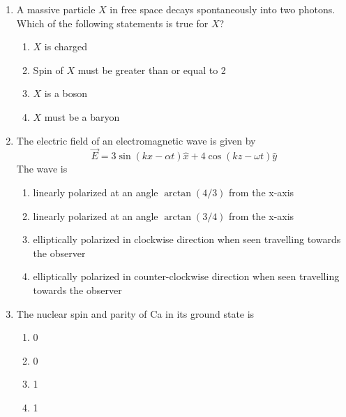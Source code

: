\documentclass[journal,12pt,onecolumn]{IEEEtran}
\begin{document}
\begin{enumerate}[itemsep=0.45cm]
\hfill{}

\begin{multicols}{2}
\begin{enumerate}
\item a removable singularity
\item an essential singularity
\item a simple pole
\item a second order pole
\end{enumerate}
\end{multicols}

\item A massive particle $X$ in free space decays spontaneously into two photons. Which of the following statements is true for $X$?

\hfill{}


\begin{enumerate}
\item $X$ is charged
\item Spin of $X$ must be greater than or equal to 2
\item $X$ is a boson
\item $X$ must be a baryon
\end{enumerate}


\item The electric field of an electromagnetic wave is given by
\[
\vec{E} = 3 \sin(kx - \alpha t) \hat{x} + 4 \cos(kz - \omega t) \hat{y}
\]  
The wave is

\hfill{}



\begin{enumerate}
\item linearly polarized at an angle $\arctan(4/3)$ from the x-axis
\item linearly polarized at an angle $\arctan(3/4)$ from the x-axis
\item elliptically polarized in clockwise direction when seen travelling towards the observer
\item elliptically polarized in counter-clockwise direction when seen travelling towards the observer
\end{enumerate}


\item The nuclear spin and parity of Ca in its ground state is

\hfill{}

\begin{multicols}{4}
\begin{enumerate}
\item 0
\item 0
\item 1
\item 1
\end{enumerate}
\end{multicols}


\end{enumerate}
\end{document}
